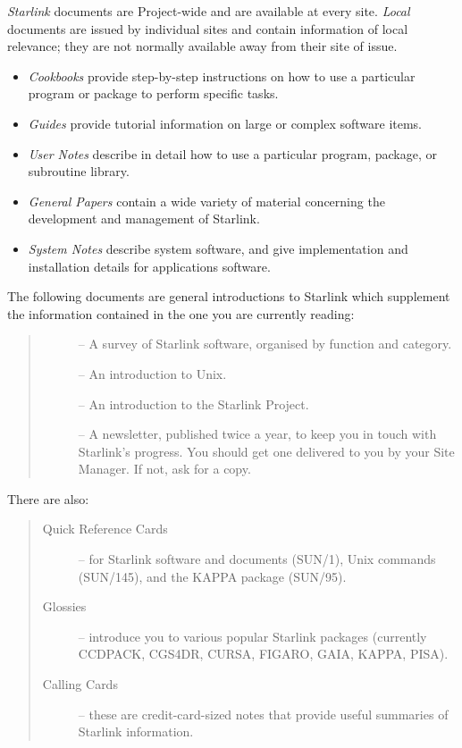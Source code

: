 \documentclass[twoside,11pt,nolof]{starlink}
\begin{document}
\emph{Starlink}\/ documents are Project-wide and are available at every site.
\emph{Local}\/ documents are issued by individual sites and contain information
of local relevance; they are not normally available away from their site of
issue.

\begin{itemize}
\item \emph{Cookbooks}\/ provide step-by-step instructions on how to use a
 particular program or package to perform specific tasks.
\item \emph{Guides}\/ provide tutorial information on large or complex software
 items.
\item \emph{User Notes}\/ describe in detail how to use a particular program,
 package, or subroutine library.
\item \emph{General Papers}\/ contain a wide variety of material concerning the
 development and management of Starlink.
\item \emph{System Notes}\/ describe system software, and give implementation and
 installation details for applications software.
\end{itemize}

The following documents are general introductions to Starlink which
supplement the information contained in the one you are currently reading:

\newpage

\begin{quote}
\begin{description}
\item []
-- A survey of Starlink software, organised by function and category.
\item []
-- An introduction to Unix.
\item []
-- An introduction to the Starlink Project.
\item []
-- A newsletter, published twice a year, to keep you in touch with Starlink's
progress.
You should get one delivered to you by your Site Manager.
If not, ask for a copy.
\end{description}
\end{quote}

There are also:

\begin{quote}
\begin{description}
\item [Quick Reference Cards]
-- for Starlink software and documents (SUN/1),
Unix commands (SUN/145),
and the KAPPA package (SUN/95).
\item [Glossies]
-- introduce you to various popular Starlink packages (currently
CCDPACK, CGS4DR, CURSA, FIGARO, GAIA, KAPPA, PISA).
\item [Calling Cards]
-- these are credit-card-sized notes that provide useful summaries of
Starlink information.
\end{description}
\end{quote}
\end{document}
